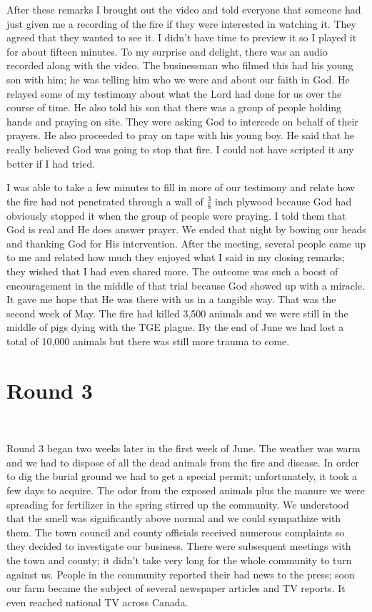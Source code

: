 \documentclass[oneside,12pt]{book}
\begin{document}
After these remarks I brought out the video and told everyone that someone had just given me a recording of the fire if they were interested in watching it. They agreed that they wanted to see it. I didn't have time to preview it so I played it for about fifteen minutes. To my surprise and delight, there was an audio recorded along with the video. The businessman who filmed this had his young son with him; he was telling him who we were and about our faith in God. He relayed some of my testimony about what the Lord had done for us over the course of time. He also told his son that there was a group of people holding hands and praying on site. They were asking God to intercede on behalf of their prayers. He also proceeded to pray on tape with his young boy. He said that he really believed God was going to stop that fire. I could not have scripted it any better if I had tried. 

I was able to take a few minutes to fill in more of our testimony and relate how the fire had not penetrated through a wall of $\frac{3}{8}$ inch plywood because God had obviously stopped it when the group of people were praying. I told them that God is real and He does answer prayer. We ended that night by bowing our heads and thanking God for His intervention. After the meeting, several people came up to me and related how much they enjoyed what I said in my closing remarks; they wished that I had even shared more. The outcome was such a boost of encouragement in the middle of that trial because God showed up with a miracle. It gave me hope that He was there with us in a tangible way. That was the second week of May. The fire had killed 3,500 animals and we were still in the middle of pigs dying with the TGE plague. By the end of June we had lost a total of 10,000 animals but there was still more trauma to come.


\section{Round 3}
\

Round 3 began two weeks later in the first week of June. The weather was warm and we had to dispose of all the dead animals from the fire and disease. In order to dig the burial ground we had to get a special permit; unfortunately, it took a few days to acquire. The odor from the exposed animals plus the manure we were spreading for fertilizer in the spring stirred up the community. We understood that the smell was significantly above normal and we could sympathize with them. The town council and county officials received numerous complaints so they decided to investigate our business. There were subsequent meetings with the town and county; it didn't take very long for the whole community to turn against us. People in the community reported their bad news to the press; soon our farm became the subject of several newspaper articles and TV reports. It even reached national TV across Canada. 
\end{document}
